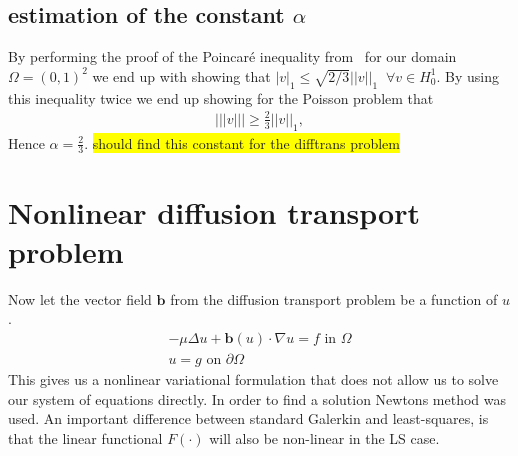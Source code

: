 \subsection{estimation of the constant $\alpha$}

By performing the proof of the Poincar\'e inequality from~\cite{Quarteroni} for our domain $\Omega=(0,1)^2$ we end up with showing that $|v|_1\leq \sqrt{2/3}||v||_1 \;\; \forall v \in H^1_0$. By using this inequality twice we end up showing for the Poisson problem that
\begin{align}
	|||v||| \geq \frac{2}{3}||v||_1,
	\label{eq:resultAlpha}
\end{align}
Hence $\alpha=\frac{2}{3}$. \colorbox{yellow}{should find this constant for the difftrans problem}
%
\section{Nonlinear diffusion transport problem}
Now let the vector field $\mathbf{b}$ from the diffusion transport problem be a function of $u$. 
\begin{align}
	-\mu \Delta u + \mathbf{b}(u) \cdot \nabla u = f \text{ in } \Omega \\
	u = g \text{ on } \partial \Omega
	\label{eq:DiffTransNonLin}
\end{align}
This gives us a nonlinear variational formulation that does not allow us to solve our system of equations directly. In order to find a solution Newtons method was used. An important difference between standard Galerkin and least-squares, is that the linear functional $F(\cdot)$ will also be non-linear in the LS case. 



